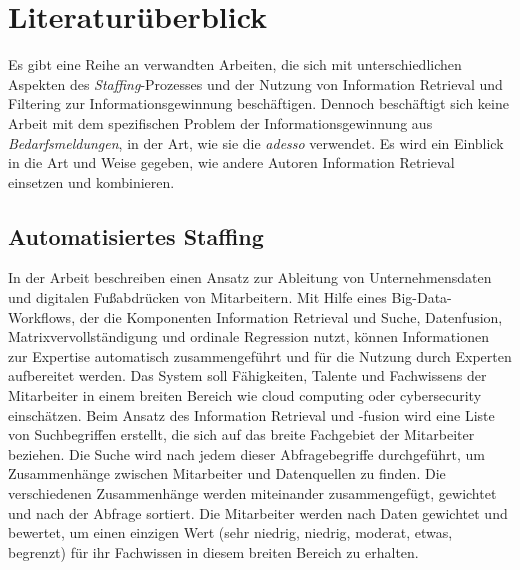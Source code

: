 \chapter{Literaturüberblick}
\label{sec:literaturueberblick}
Es gibt eine Reihe an verwandten Arbeiten, die sich mit unterschiedlichen Aspekten des \emph{Staffing}-Prozesses und der Nutzung von Information Retrieval und Filtering zur Informationsgewinnung beschäftigen. Dennoch beschäftigt sich keine Arbeit mit dem spezifischen Problem der Informationsgewinnung aus \emph{Bedarfsmeldungen}, in der Art, wie sie die \emph{adesso} verwendet. Es wird ein Einblick in die Art und Weise gegeben, wie andere Autoren Information Retrieval einsetzen und kombinieren.\\

\section{Automatisiertes Staffing}
In der Arbeit \cite{horesh2016information} beschreiben \citeauthor{horesh2016information} einen Ansatz zur Ableitung von Unternehmensdaten und digitalen Fußabdrücken von Mitarbeitern. Mit Hilfe eines Big-Data-Workflows, der die Komponenten Information Retrieval und Suche, Datenfusion, Matrixvervollständigung und ordinale Regression nutzt, können Informationen zur Expertise automatisch zusammengeführt und für die Nutzung durch Experten aufbereitet werden. Das System soll Fähigkeiten, Talente und Fachwissens der Mitarbeiter in einem breiten Bereich wie cloud computing oder cybersecurity einschätzen. Beim Ansatz des Information Retrieval und -fusion wird eine Liste von Suchbegriffen erstellt, die sich auf das breite Fachgebiet der Mitarbeiter beziehen. Die Suche wird nach jedem dieser Abfragebegriffe durchgeführt, um Zusammenhänge zwischen Mitarbeiter und Datenquellen zu finden. Die verschiedenen Zusammenhänge werden miteinander zusammengefügt, gewichtet und nach der Abfrage sortiert. Die Mitarbeiter werden nach Daten gewichtet und bewertet, um einen einzigen Wert (sehr niedrig, niedrig, moderat, etwas, begrenzt) für ihr Fachwissen in diesem breiten Bereich zu erhalten.\\

